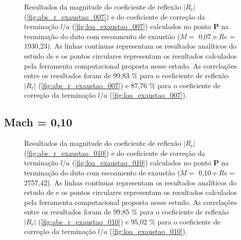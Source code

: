 \begin{figure}[ht!]
\begin{subfigure}{\scaleA \textwidth}
  
\end{subfigure}%
\begin{subfigure}{\scaleA \textwidth}
  
\end{subfigure}
\caption[Resultados de $|R_{r}|$ e $l/a$ com escoamento de exaustão ($M =$ 0,07 e $Re =$ 1930,23)]{Resultados da magnitude do coeficiente de reflexão $|R_{r}|$ (\ref{fig:abs_r_exaustao_007}) e do coeficiente de correção da terminação $l/a$ (\ref{fig:loa_exaustao_007}) calculados no ponto $\textbf{P}$ na terminação do duto com escoamento de exaustão ($M =$ 0,07 e $Re =$ 1930,23). As linhas contínuas representam os resultados analíticos do estudo de  e os pontos circulares representam os resultados calculados pela ferramenta computacional proposta nesse estudo. As correlações entre os resultados foram de 99,83 \% para o coeficiente de reflexão $|R_{r}|$ (\ref{fig:abs_r_exaustao_007}) e 87,76 \% para o coeficiente de correção da terminação $l/a$ (\ref{fig:loa_exaustao_007}).}
\label{fig:resultados_exaustao_007}
\end{figure}

\newpage
\subsection{Mach = 0,10}
\begin{figure}[ht!]
\begin{subfigure}{\scaleA \textwidth}
  
\end{subfigure}%
\begin{subfigure}{\scaleA \textwidth}
  
\end{subfigure}
\caption[Resultados de $|R_{r}|$ e $l/a$ com escoamento de exaustão ($M =$ 0,10 e $Re =$ 2757,42)]{Resultados da magnitude do coeficiente de reflexão $|R_{r}|$ (\ref{fig:abs_r_exaustao_010}) e do coeficiente de correção da terminação $l/a$ (\ref{fig:loa_exaustao_010}) calculados no ponto $\textbf{P}$ na terminação do duto com escoamento de exaustão ($M =$ 0,10 e $Re =$ 2757,42). As linhas contínuas representam os resultados analíticos do estudo de  e os pontos circulares representam os resultados calculados pela ferramenta computacional proposta nesse estudo. As correlações entre os resultados foram de 99,85 \% para o coeficiente de reflexão $|R_{r}|$ (\ref{fig:abs_r_exaustao_010}) e 95,02 \% para o coeficiente de correção da terminação $l/a$ (\ref{fig:loa_exaustao_010}).}
\label{fig:resultados_exaustao_010}
\end{figure}


